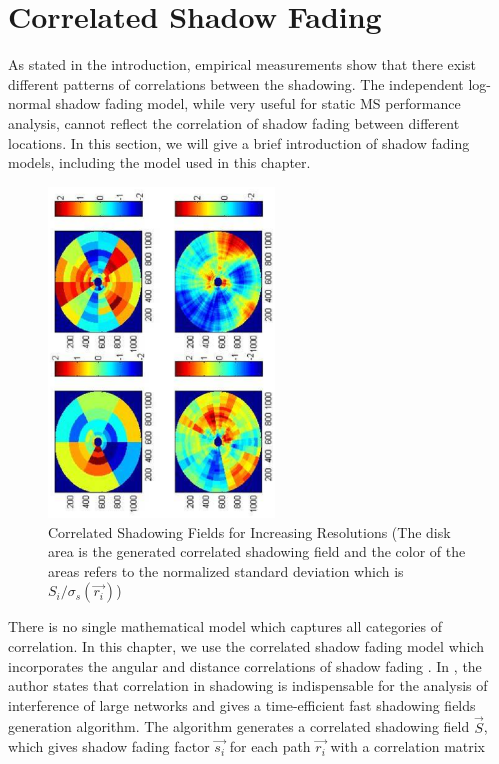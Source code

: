 \section{Correlated Shadow Fading}
\label{sec:Shadow}
As stated in the introduction, empirical measurements show that there exist different patterns of correlations between the shadowing. The independent log-normal shadow fading model, while very useful for static MS performance analysis, cannot reflect the correlation of shadow fading between different locations. In this section, we will give a brief introduction of shadow fading models, including the model used in this chapter.
\begin{figure}
\centering
\includegraphics[width=6cm,angle=270]{shadowingfield_V3.eps}
\caption{Correlated Shadowing Fields for Increasing Resolutions (The disk area is the generated correlated shadowing field and the color of the areas refers to the normalized standard deviation which is $S_{i}/\sigma_{s}(\vec{r_{i}})$)}
\label{2:shadowingfield}
\end{figure}
There is no single mathematical model which captures all categories of correlation\cite{szyszkowicz2010feasibility}. In this chapter, we use the correlated shadow fading model which incorporates the angular and distance correlations of shadow fading \cite{szyszkowicz2011interference}. In \cite{szyszkowicz2011interference}, the author states that correlation in shadowing is indispensable for the analysis of interference of large networks and gives a time-efficient fast shadowing fields generation algorithm. The algorithm generates a correlated shadowing field $\vec{S}$, which gives shadow fading factor $\vec{s_{i}}$ for each path $\vec{r_{i}}$ with a correlation matrix
